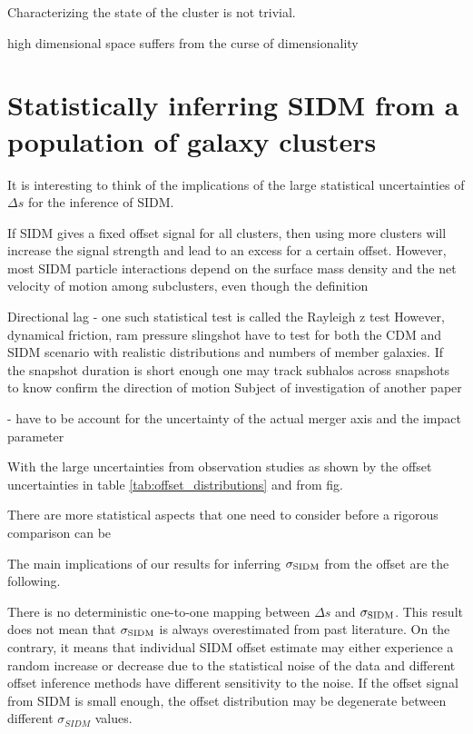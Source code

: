 Characterizing the state of the cluster is not trivial.

high dimensional space suffers from the curse of dimensionality 


% 

\section{Statistically inferring SIDM from a population of galaxy clusters} 

It is interesting to think of the implications of the large statistical 
uncertainties of $\Delta s$ for the inference of SIDM.

If SIDM gives a fixed offset signal for all clusters, then using more clusters
will increase the signal strength and lead to an excess for a certain offset. 
However, most SIDM particle interactions depend on the surface mass
density and the net velocity of motion among subclusters, even though the definition 

Directional lag - one such statistical test is called the Rayleigh z test  
However, dynamical friction, ram pressure slingshot have to test for both the
CDM and SIDM scenario with realistic distributions and numbers of member galaxies.  
If the snapshot duration is short enough
 one may track subhalos across snapshots to know confirm the
direction of motion  Subject of investigation of another paper 



- have to be account for the uncertainty of the actual merger
axis and the impact parameter  


With the large uncertainties from observation studies as shown by the offset
uncertainties in table \ref{tab:offset_distributions} and from fig. 

There are more statistical aspects that one need to consider before a rigorous
comparison can be 


The main implications of our results for inferring $\sigma_{\rm SIDM}$ from the
offset are the following.

There is no deterministic one-to-one mapping between $\Delta s$ and 
$\sigma_{\rm SIDM}$.  
This result does not mean that $\sigma_{\rm SIDM}$ is always overestimated from
past literature. 
On the contrary, it means that individual SIDM offset estimate may either
experience a random increase or decrease due to the statistical noise of 
 the data and different offset inference methods have different sensitivity to 
 the noise.
If the offset signal from SIDM is small enough, the offset distribution may be
degenerate between different $\sigma_{SIDM}$ values.


